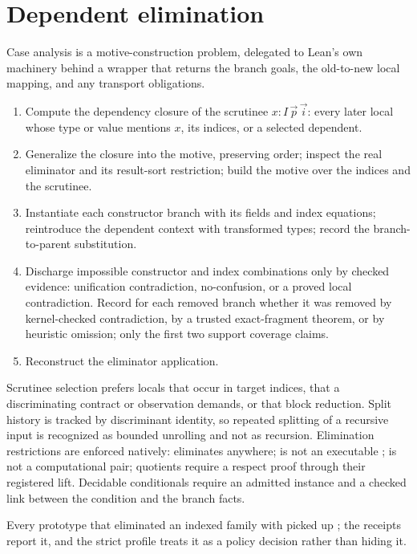 \section{Dependent elimination}\label{sec:elimination}

Case analysis is a motive-construction problem, delegated to Lean's own machinery behind a wrapper that returns the branch goals, the old-to-new local mapping, and any transport obligations.

\begin{enumerate}
\item Compute the dependency closure of the scrutinee $x : I\,\vec p\,\vec i$: every later local whose type or value mentions $x$, its indices, or a selected dependent.
\item Generalize the closure into the motive, preserving order; inspect the real eliminator and its result-sort restriction; build the motive over the indices and the scrutinee.
\item Instantiate each constructor branch with its fields and index equations; reintroduce the dependent context with transformed types; record the branch-to-parent substitution.
\item Discharge impossible constructor and index combinations only by checked evidence: unification contradiction, no-confusion, or a proved local contradiction. Record for each removed branch whether it was removed by kernel-checked contradiction, by a trusted exact-fragment theorem, or by heuristic omission; only the first two support coverage claims.
\item Reconstruct the eliminator application.
\end{enumerate}

Scrutinee selection prefers locals that occur in target indices, that a discriminating contract or observation demands, or that block reduction. Split history is tracked by discriminant identity, so repeated splitting of a recursive input is recognized as bounded unrolling and not as recursion. Elimination restrictions are enforced natively:  eliminates anywhere;  is not an executable ;  is not a computational pair; quotients require a respect proof through their registered lift. Decidable conditionals require an admitted  instance and a checked link between the condition and the branch facts.

Every prototype that eliminated an indexed family with  picked up ; the receipts report it, and the strict profile treats it as a policy decision rather than hiding it.

